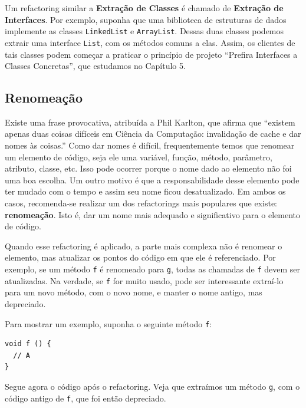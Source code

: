 \documentclass[
  11pt,
  twoside]{book}
\newcommand{\passthrough}[1]{#1}
\begin{document}
Um refactoring similar a \textbf{Extração de Classes} é chamado de
\textbf{Extração de Interfaces}. Por exemplo, suponha que uma biblioteca
de estruturas de dados implemente as classes
\passthrough{\lstinline!LinkedList!} e
\passthrough{\lstinline!ArrayList!}. Dessas duas classes podemos extrair
uma interface \passthrough{\lstinline!List!}, com os métodos comuns a
elas. Assim, os clientes de tais classes podem começar a praticar o
princípio de projeto ``Prefira Interfaces a Classes Concretas'', que
estudamos no Capítulo 5.

\hypertarget{renomeauxe7uxe3o}{%
\subsection{Renomeação}\label{renomeauxe7uxe3o}}


Existe uma frase provocativa, atribuída a Phil Karlton, que afirma que
``existem apenas duas coisas difíceis em Ciência da Computação:
invalidação de cache e dar nomes às coisas.'' Como dar nomes é difícil,
frequentemente temos que renomear um elemento de código, seja ele uma
variável, função, método, parâmetro, atributo, classe, etc. Isso pode
ocorrer porque o nome dado ao elemento não foi uma boa escolha. Um outro
motivo é que a responsabilidade desse elemento pode ter mudado com o
tempo e assim seu nome ficou desatualizado. Em ambos os casos,
recomenda-se realizar um dos refactorings mais populares que existe:
\textbf{renomeação}. Isto é, dar um nome mais adequado e significativo
para o elemento de código.

Quando esse refactoring é aplicado, a parte mais complexa não é renomear
o elemento, mas atualizar os pontos do código em que ele é referenciado.
Por exemplo, se um método \passthrough{\lstinline!f!} é renomeado para
\passthrough{\lstinline!g!}, todas as chamadas de
\passthrough{\lstinline!f!} devem ser atualizadas. Na verdade, se
\passthrough{\lstinline!f!} for muito usado, pode ser interessante
extraí-lo para um novo método, com o novo nome, e manter o nome antigo,
mas depreciado.

Para mostrar um exemplo, suponha o seguinte método
\passthrough{\lstinline!f!}:

\begin{lstlisting}
void f () {
  // A
}
\end{lstlisting}

Segue agora o código após o refactoring. Veja que extraímos um método
\passthrough{\lstinline!g!}, com o código antigo de
\passthrough{\lstinline!f!}, que foi então depreciado.
\end{document}
